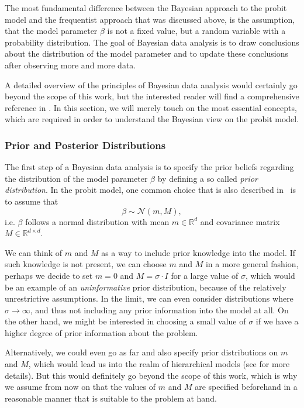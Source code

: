The most fundamental difference between the Bayesian approach to
the probit model and the frequentist approach that was discussed above,
is the assumption, that the model parameter $\beta$ is not a fixed
value, but a random variable with a probability distribution.
The goal of Bayesian data analysis is to draw conclusions about
the distribution of the model parameter and to update these
conclusions after observing more and more data.

A detailed overview of the principles of Bayesian data
analysis would certainly go beyond the scope of this work,
but the interested reader will find a comprehensive reference
in \cite{bayes-gelman}.
In this section, we will merely touch on the most essential concepts,
which are required in order to understand the Bayesian view on the
probit model.

\subsubsection{Prior and Posterior Distributions}

The first step of a Bayesian data analysis is to specify the
prior beliefs regarding the distribution of the model
parameter $\beta$ by defining a so called \textit{prior distribution}.
In the probit model, one common choice that is also described
in~\cite{regression-fahrmeir} is to assume that
\begin{equation}
    \beta \sim \mathcal{N}(m, M),
\end{equation}
i.e. $\beta$ follows a normal distribution with mean
$m \in \mathbb{R}^d$ and
covariance matrix $M \in \mathbb{R}^{d \times d}$.

We can think of $m$ and $M$ as a way to
include prior knowledge into the model.
If such knowledge is not present, we can choose $m$ and
$M$ in a more general fashion, perhaps we decide
to set $m = 0$ and $M = \sigma \cdot I$
for a large value of $\sigma$, which would
be an example of an \textit{uninformative} prior distribution,
because of the relatively unrestrictive assumptions.
In the limit, we can even consider distributions where
$\sigma \rightarrow \infty$, and thus not including any prior
information into the model at all.
On the other hand, we might be interested in choosing a
small value of $\sigma$ if we have a higher degree of
prior information about the problem.

Alternatively, we could even go as far and also specify prior
distributions on $m$ and $M$, which would
lead us into the realm of hierarchical models
(see \cite{bayes-gelman} for more details). But this would definitely
go beyond the scope of this work, which is why we assume from
now on that the values of $m$ and $M$
are specified beforehand in a reasonable manner that
is suitable to the problem at hand.


